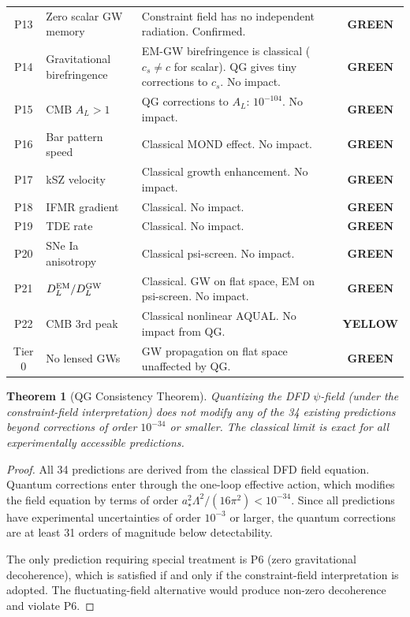 \documentclass[11pt,a4paper]{article}
\newtheorem{theorem}{Theorem}
\newcommand{\GREEN}{\textcolor{dfdgreen}{\textbf{GREEN}}}
\newcommand{\YELLOW}{\textcolor{dfdyellow}{\textbf{YELLOW}}}
\begin{document}
\begin{center}
\begin{longtable}{clp{6cm}c}
P13 & Zero scalar GW memory & Constraint field has no independent radiation. Confirmed. & \GREEN \\
P14 & Gravitational birefringence & EM-GW birefringence is classical ($c_s \neq c$ for scalar). QG gives tiny corrections to $c_s$. No impact. & \GREEN \\
P15 & CMB $A_L > 1$ & QG corrections to $A_L$: $10^{-104}$. No impact. & \GREEN \\
P16 & Bar pattern speed & Classical MOND effect. No impact. & \GREEN \\
P17 & kSZ velocity & Classical growth enhancement. No impact. & \GREEN \\
P18 & IFMR gradient & Classical. No impact. & \GREEN \\
P19 & TDE rate & Classical. No impact. & \GREEN \\
P20 & SNe Ia anisotropy & Classical psi-screen. No impact. & \GREEN \\
P21 & $D_L^{\rm EM}/D_L^{\rm GW}$ & Classical. GW on flat space, EM on psi-screen. No impact. & \GREEN \\
P22 & CMB 3rd peak & Classical nonlinear AQUAL. No impact from QG. & \YELLOW \\
Tier 0 & No lensed GWs & GW propagation on flat space unaffected by QG. & \GREEN \\
\bottomrule
\end{longtable}
\end{center}

\begin{theorem}[QG Consistency Theorem]
\label{thm:QG-consistency}
Quantizing the DFD $\psi$-field (under the constraint-field interpretation) does not modify any of the 34 existing predictions beyond corrections of order $10^{-34}$ or smaller. The classical limit is exact for all experimentally accessible predictions.
\end{theorem}

\begin{proof}
All 34 predictions are derived from the classical DFD field equation. Quantum corrections enter through the one-loop effective action, which modifies the field equation by terms of order $a_\star^2\Lambda^2/(16\pi^2) < 10^{-34}$. Since all predictions have experimental uncertainties of order $10^{-3}$ or larger, the quantum corrections are at least 31 orders of magnitude below detectability.

The only prediction requiring special treatment is P6 (zero gravitational decoherence), which is satisfied if and only if the constraint-field interpretation is adopted. The fluctuating-field alternative would produce non-zero decoherence and violate P6.
\end{proof}
\end{document}
